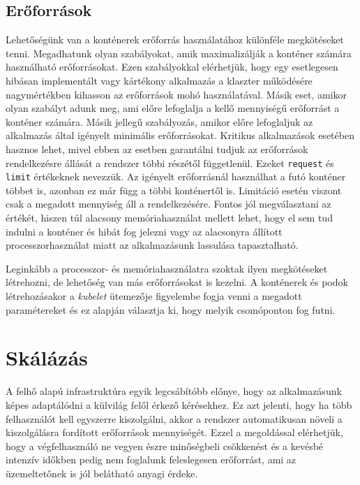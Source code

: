 \subsection{Erőforrások}
Lehetőségünk van a konténerek erőforrás használatához különféle megkötéseket tenni. 
Megadhatunk olyan szabályokat, amik maximalizálják a konténer számára használható erőforrásokat.
Ezen szabályokkal elérhetjük, hogy egy esetlegesen hibásan implementált vagy kártékony alkalmazás a klaszter működésére nagymértékben kihasson az erőforrások mohó használatával.
Másik eset, amikor olyan szabályt adunk meg, ami előre lefoglalja a kellő mennyiségű erőforrást a konténer számára.
Másik jellegű szabályozás, amikor előre lefoglaljuk az alkalmazás által igényelt minimális erőforrásokat.
Kritikus alkalmazások esetében hasznos lehet, mivel ebben az esetben garantálni tudjuk az erőforrások rendelkezésre állását a rendszer többi részétől függetlenül.
Ezeket \verb+request+  és \verb+limit+ értékeknek nevezzük.
Az igényelt erőforrásnál használhat a futó konténer többet is, azonban ez már függ a többi konténertől is.
Limitáció esetén viszont csak a megadott mennyiség áll a rendelkezésére.
Fontos jól megválasztani az értékét, hiszen túl alacsony memóriahasználat mellett lehet, hogy el sem tud indulni a konténer és hibát fog jelezni vagy az alacsonyra állított processzorhasználat miatt az alkalmazásunk lassulása tapasztalható.

Leginkább a processzor- és memóriahasználatra szoktak ilyen megkötéseket létrehozni, de lehetőség van más erőforrásokat is kezelni.
A konténerek és podok létrehozásakor a \textit{kubelet} ütemezője figyelembe fogja venni a megadott paramétereket és ez alapján választja ki, hogy melyik csomóponton fog futni.

\section{Skálázás}
A felhő alapú infrastruktúra egyik legcsábítóbb előnye, hogy az alkalmazásunk képes adaptálódni a külvilág felől érkező kérésekhez. Ez azt jelenti, hogy ha több felhasználót kell egyszerre kiszolgálni, akkor a rendszer automatikusan növeli a kiszolgálásra fordított erőforrások mennyiségét. Ezzel a megoldással elérhetjük, hogy a végfelhasználó ne vegyen észre minőségbeli csökkenést és a kevésbé intenzív időkben pedig nem foglalunk feleslegesen erőforrást, ami az üzemeltetőnek is jól belátható anyagi érdeke.
 
